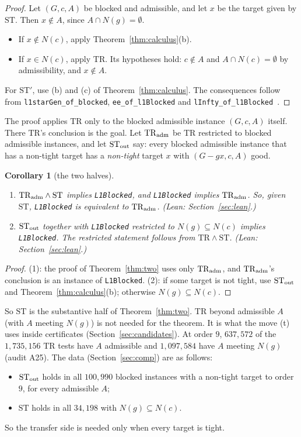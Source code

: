 \documentclass[11pt]{amsart}
\newtheorem{corollary}[theorem]{Corollary}
\theoremstyle{definition}
\newcommand{\TR}{\mathrm{TR}}
\newcommand{\ST}{\mathrm{ST}}
\begin{document}
\begin{proof}
Let $(G,c,A)$ be blocked and admissible, and let $x$ be the target given by $\ST$. Then $x\notin A$,
since $A\cap N(g)=\emptyset$.
\begin{itemize}
\item If $x\notin N(c)$, apply Theorem~\ref{thm:calculus}(b).
\item If $x\in N(c)$, apply $\TR$. Its hypotheses hold: $c\notin A$ and $A\cap N(c)=\emptyset$ by
admissibility, and $x\notin A$.
\end{itemize}
For $\ST'$, use (b) and (c) of Theorem~\ref{thm:calculus}. The consequences follow from
\texttt{l1starGen\_of\_blocked}, \texttt{ee\_of\_l1Blocked} and
\texttt{lInfty\_of\_l1Blocked}~\cite{L1S,TF}.
\end{proof}

The proof applies $\TR$ only to the blocked admissible instance $(G,c,A)$ itself. There $\TR$'s
conclusion is the goal. Let $\TR_{\rm adm}$ be $\TR$ restricted to blocked admissible instances, and
let $\ST_{\rm out}$ say: every blocked admissible instance that has a non-tight target has a
\emph{non-tight} target $x$ with $(G-gx,c,A)$ good.

\begin{corollary}[the two halves]\label{cor:refined}
\begin{enumerate}
\item $\TR_{\rm adm}\wedge\ST$ implies \texttt{L1Blocked}, and \texttt{L1Blocked} implies
$\TR_{\rm adm}$. So, given $\ST$, \texttt{L1Blocked} is equivalent to $\TR_{\rm adm}$.
\quad\emph{(Lean: Section~\ref{sec:lean}.)}
\item $\ST_{\rm out}$ together with \texttt{L1Blocked} restricted to $N(g)\subseteq N(c)$ implies
\texttt{L1Blocked}. The restricted statement follows from $\TR\wedge\ST$.
\quad\emph{(Lean: Section~\ref{sec:lean}.)}
\end{enumerate}
\end{corollary}

\begin{proof}
(1): the proof of Theorem~\ref{thm:two} uses only $\TR_{\rm adm}$, and $\TR_{\rm adm}$'s conclusion is
an instance of \texttt{L1Blocked}. (2): if some target is not tight, use $\ST_{\rm out}$ and
Theorem~\ref{thm:calculus}(b); otherwise $N(g)\subseteq N(c)$.
\end{proof}

So $\ST$ is the substantive half of Theorem~\ref{thm:two}. $\TR$ beyond admissible $A$ (with $A$
meeting $N(g)$) is not needed for the theorem. It is what the move (t) uses inside certificates
(Section~\ref{sec:candidates}). At order $9$, $637{,}572$ of the $1{,}735{,}156$ $\TR$ tests have $A$
admissible and $1{,}097{,}584$ have $A$ meeting $N(g)$ (audit A25). The data
(Section~\ref{sec:comp}) are as follows:
\begin{itemize}
\item $\ST_{\rm out}$ holds in all $100{,}990$ blocked instances with a non-tight target to order $9$,
for every admissible $A$;
\item $\ST$ holds in all $34{,}198$ with $N(g)\subseteq N(c)$.
\end{itemize}
So the transfer side is needed only when every target is tight.
\end{document}
